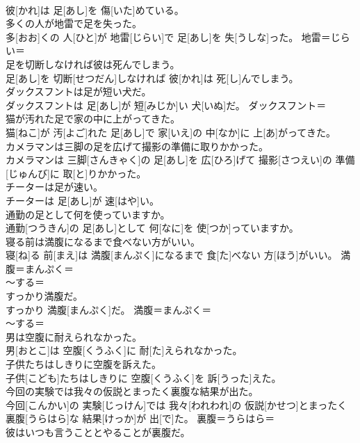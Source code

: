 \documentclass[8pt]{extreport}
\begin{document}
\begin{CJK}{UTF8}{min}
{\\	彼[かれ]は 足[あし]を 傷[いた]めている。	
\\	多くの人が地雷で足を失った。	
\\	多[おお]くの 人[ひと]が 地雷[じらい]で 足[あし]を 失[うしな]った。	地雷＝じらい＝ 
\\	足を切断しなければ彼は死んでしまう。	
\\	足[あし]を 切断[せつだん]しなければ 彼[かれ]は 死[し]んでしまう。	
\\	ダックスフントは足が短い犬だ。	
\\	ダックスフントは 足[あし]が 短[みじか]い 犬[いぬ]だ。	ダックスフント＝ 
\\	猫が汚れた足で家の中に上がってきた。	
\\	猫[ねこ]が 汚[よご]れた 足[あし]で 家[いえ]の 中[なか]に 上[あ]がってきた。	
\\	カメラマンは三脚の足を広げて撮影の準備に取りかかった。	
\\	カメラマンは 三脚[さんきゃく]の 足[あし]を 広[ひろ]げて 撮影[さつえい]の 準備[じゅんび]に 取[と]りかかった。	
\\	チーターは足が速い。	
\\	チーターは 足[あし]が 速[はや]い。	
\\	通勤の足として何を使っていますか。	
\\	通勤[つうきん]の 足[あし]として 何[なに]を 使[つか]っていますか。	
\\	寝る前は満腹になるまで食べない方がいい。	
\\	寝[ね]る 前[まえ]は 満腹[まんぷく]になるまで 食[た]べない 方[ほう]がいい。	満腹＝まんぷく＝ 
\\	〜する＝ 
\\	すっかり満腹だ。	
\\	すっかり 満腹[まんぷく]だ。	満腹＝まんぷく＝ 
\\	〜する＝ 
\\	男は空腹に耐えられなかった。	
\\	男[おとこ]は 空腹[くうふく]に 耐[た]えられなかった。	
\\	子供たちはしきりに空腹を訴えた。	
\\	子供[こども]たちはしきりに 空腹[くうふく]を 訴[うった]えた。	
\\	今回の実験では我々の仮説とまったく裏腹な結果が出た。	
\\	今回[こんかい]の 実験[じっけん]では 我々[われわれ]の 仮説[かせつ]とまったく 裏腹[うらはら]な 結果[けっか]が 出[で]た。	裏腹＝うらはら＝ 
\\	彼はいつも言うこととやることが裏腹だ。	
}
\end{CJK}
\end{document}

